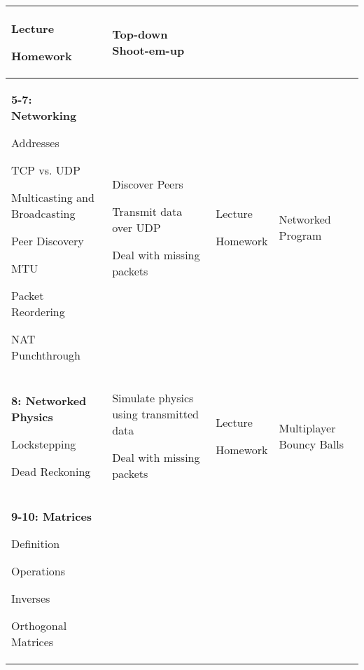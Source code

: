 \documentclass[10pt]{article}
\newenvironment{itemize*}{
\begin{itemize}[leftmargin=1em,noitemsep,nolistsep]
}{\end{itemize}}
\begin{document}
\begin{longtable}{||p{1.8in}|p{2.4in}|p{1.3in}|p{1in}||}
\begin{itemize*}
		\item Lecture
		\item Homework
	\end{itemize*} & Top-down Shoot-em-up \\ \hline
\textbf{5-7: Networking}
	\begin{itemize*}
		\item Addresses
		\item TCP vs. UDP
		\item Multicasting and Broadcasting
		\item Peer Discovery
		\item MTU
		\item Packet Reordering
		\item NAT Punchthrough
	\end{itemize*} &
	\begin{itemize*}
		\item Discover Peers
		\item Transmit data over UDP
		\item Deal with missing packets
	\end{itemize*} &
	\begin{itemize*}
		\item Lecture
		\item Homework
	\end{itemize*} & Networked Program\\ \hline
\textbf{8: Networked Physics}
	\begin{itemize*}
		\item Lockstepping
		\item Dead Reckoning
	\end{itemize*} &
	\begin{itemize*}
		\item Simulate physics using transmitted data
		\item Deal with missing packets
	\end{itemize*} &
	\begin{itemize*}
		\item Lecture
		\item Homework
	\end{itemize*} & Multiplayer Bouncy Balls\\ \hline
\textbf{9-10: Matrices} 
	\begin{itemize*}
		 \item Definition
		 \item Operations
		 \item Inverses
		 \item Orthogonal Matrices

\end{itemize*}
\end{longtable}
\end{document}
